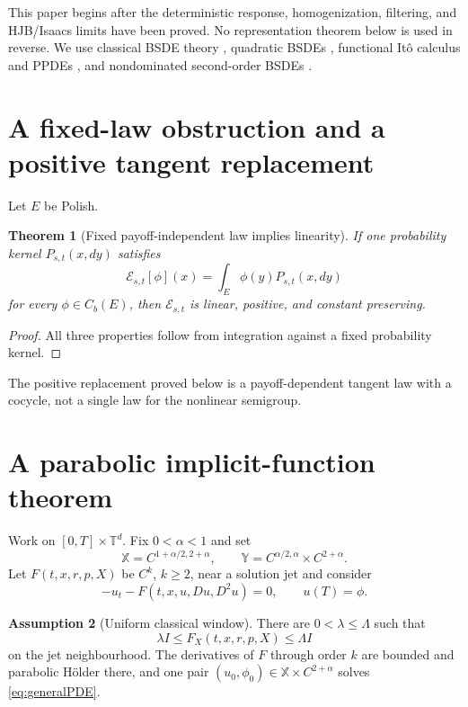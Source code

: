 \documentclass[11pt,reqno]{amsart}
\newtheorem{theorem}{Theorem}[section]
\theoremstyle{definition}
\newtheorem{assumption}[theorem]{Assumption}
\theoremstyle{remark}
\newcommand{\T}{\mathbb T}
\newcommand{\cE}{\mathcal E}
\begin{document}
This paper begins after the deterministic response, homogenization, filtering,
and HJB/Isaacs limits have been proved.  No representation theorem below is
used in reverse.  We use classical BSDE theory \cite{PardouxPeng1990,
ElKarouiPengQuenez1997}, quadratic BSDEs \cite{Kobylanski2000}, functional
It\^o calculus and PPDEs \cite{Dupire2009,ContFournie2013,
EkrenTouziZhang2014I,EkrenTouziZhang2014II}, and nondominated second-order
BSDEs \cite{CheriditoSonerTouziVictoir2007,SonerTouziZhang2012}.

\section{A fixed-law obstruction and a positive tangent replacement}\label{sec:obstruction}
Let $E$ be Polish.

\begin{theorem}[Fixed payoff-independent law implies linearity]\label{thm:fixedlaw}
If one probability kernel $P_{s,t}(x,dy)$ satisfies
\[
 \cE_{s,t}[\phi](x)=\int_E\phi(y)P_{s,t}(x,dy)
\]
for every $\phi\in C_b(E)$, then $\cE_{s,t}$ is linear, positive, and constant
preserving.
\end{theorem}

\begin{proof}
All three properties follow from integration against a fixed probability
kernel.
\end{proof}

The positive replacement proved below is a payoff-dependent tangent law with a
cocycle, not a single law for the nonlinear semigroup.

\section{A parabolic implicit-function theorem}\label{sec:IFT}
Work on $[0,T]\times\T^d$.  Fix $0<\alpha<1$ and set
\[
 \mathbb X=C^{1+\alpha/2,2+\alpha},
 \qquad
 \mathbb Y=C^{\alpha/2,\alpha}\times C^{2+\alpha}.
\]
Let $F(t,x,r,p,X)$ be $C^k$, $k\ge2$, near a solution jet and consider
\begin{equation}\label{eq:generalPDE}
 -u_t-F(t,x,u,Du,D^2u)=0,
 \qquad u(T)=\phi.
\end{equation}

\begin{assumption}[Uniform classical window]\label{ass:window}
There are $0<\lambda\le\Lambda$ such that
\[
 \lambda I\le F_X(t,x,r,p,X)\le\Lambda I
\]
on the jet neighbourhood.  The derivatives of $F$ through order $k$ are
bounded and parabolic H\"older there, and one pair
$(u_0,\phi_0)\in\mathbb X\times C^{2+\alpha}$ solves
\eqref{eq:generalPDE}.
\end{assumption}
\end{document}
